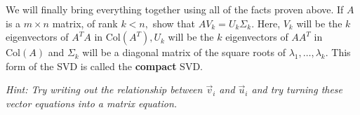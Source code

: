 \begin{enumerate}
  \qitem We will finally bring everything together using all of the facts proven above. 
  If $A$ is a $m \times n$ matrix, of rank $k < n,$ show that $AV_{k} = U_{k} \Sigma_{k}.$ 
  Here, $V_{k}$ will be the $k$ eigenvectors of $A^{T}A$ in $\text{Col}(A^{T}), U_{k}$ will be the $k$ eigenvectors of $AA^{T}$ in $\text{Col}(A)$ and $\Sigma_{k}$ will be a diagonal matrix of the square roots of $\lambda_{1}, \dotsc, \lambda_{k}.$ This form of the SVD is called the \textbf{compact} SVD.

  \textit{Hint: Try writing out the relationship between $\vec{v}_{i}$ and $\vec{u}_{i}$ and try turning these vector equations into a matrix equation.}



\end{enumerate}
